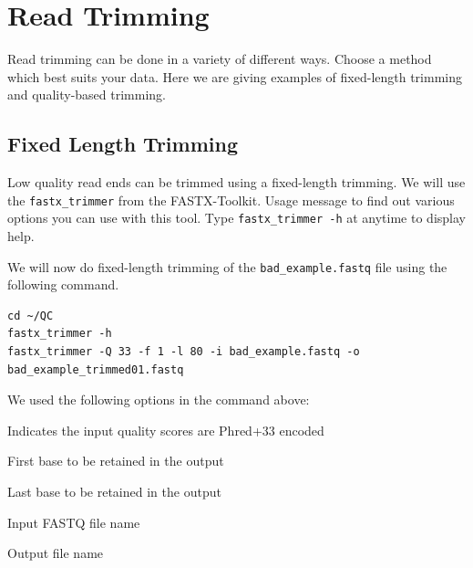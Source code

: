 \section{Read Trimming}
Read trimming can be done in a variety of different ways. Choose a method
which best suits your data. Here we are giving examples of fixed-length trimming
and quality-based trimming.

\subsection{Fixed Length Trimming}
Low quality read ends can be trimmed using a fixed-length trimming. We will use the
\texttt{fastx\_trimmer} from the FASTX-Toolkit. Usage message to find out various options
you can use with this tool. Type \texttt{fastx\_trimmer -h} at anytime to display help.

\begin{steps}
We will now do fixed-length trimming of the \texttt{bad\_example.fastq} file
using the following command.
\begin{lstlisting}
cd ~/QC
fastx_trimmer -h
fastx_trimmer -Q 33 -f 1 -l 80 -i bad_example.fastq -o bad_example_trimmed01.fastq
\end{lstlisting}
\end{steps}

\begin{note}
We used the following options in the command above:
\begin{description}[style=multiline,labelindent=0cm,align=right,leftmargin=\descriptionlabelspace,rightmargin=1.5cm,font=\ttfamily]
 \item[-Q 33] Indicates the input quality scores are Phred+33 encoded
 \item[-f] First base to be retained in the output
 \item[-l] Last base to be retained in the output
 \item[-i] Input FASTQ file name
 \item[-o] Output file name
\end{description}
\end{note}


